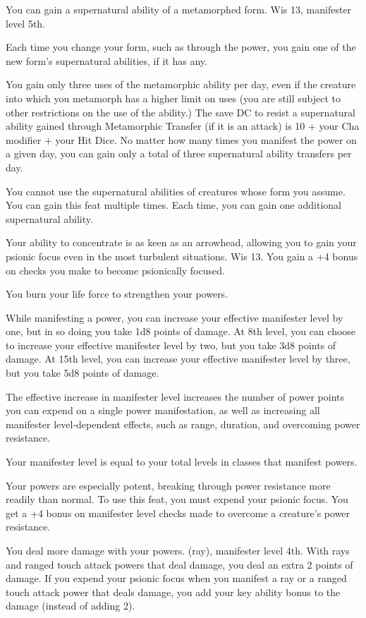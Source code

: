 {You can gain a supernatural ability of a metamorphed form.}
{Wis 13, manifester level 5th.}
{Each time you change your form, such as through the  power, you gain one of the new form's supernatural abilities, if it has any.

You gain only three uses of the metamorphic ability per day, even if the creature into which you metamorph has a higher limit on uses (you are still subject to other restrictions on the use of the ability.) The save DC to resist a supernatural ability gained through Metamorphic Transfer (if it is an attack) is 10 + your Cha modifier + \onehalf your Hit Dice. No matter how many times you manifest the  power on a given day, you can gain only a total of three supernatural ability transfers per day.}
{You cannot use the supernatural abilities of creatures whose form you assume.}
{You can gain this feat multiple times. Each time, you can gain one additional supernatural ability.}

{Your ability to concentrate is as keen as an arrowhead, allowing you to gain your psionic focus even in the most turbulent situations.}
{Wis 13.}
{You gain a +4 bonus on  checks you make to become psionically focused.}
{}{}

{You burn your life force to strengthen your powers.}
{}
{While manifesting a power, you can increase your effective manifester level by one, but in so doing you take 1d8 points of damage. At 8th level, you can choose to increase your effective manifester level by two, but you take 3d8 points of damage. At 15th level, you can increase your effective manifester level by three, but you take 5d8 points of damage.

The effective increase in manifester level increases the number of power points you can expend on a single power manifestation, as well as increasing all manifester level-dependent effects, such as range, duration, and overcoming power resistance.}
{Your manifester level is equal to your total levels in classes that manifest powers.}
{}

{Your powers are especially potent, breaking through power resistance more readily than normal.}
{}
{To use this feat, you must expend your psionic focus. You get a +4 bonus on manifester level checks made to overcome a creature's power resistance.}
{}{}

{You deal more damage with your powers.}
{ (ray), manifester level 4th.}
{With rays and ranged touch attack powers that deal damage, you deal an extra 2 points of damage. If you expend your psionic focus when you manifest a ray or a ranged touch attack power that deals damage, you add your key ability bonus to the damage (instead of adding 2).}
{}{}

